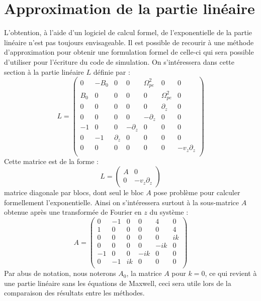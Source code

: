 
\section{Approximation de la partie linéaire}

L'obtention, à l'aide d'un logiciel de calcul formel, de l'exponentielle de la partie linéaire n'est pas toujours envisageable. Il est possible de recourir à une méthode d'approximation pour obtenir une formulation formel de celle-ci qui sera possible d'utiliser pour l'écriture du code de simulation. On s'intéressera dans cette section à la partie linéaire $L$ définie par :
$$
  L = \begin{pmatrix}
    0   & -B_0 & 0          &  0          &  \Omega_{pe}^2 & 0             & 0 \\
    B_0 &  0   & 0          &  0          &  0             & \Omega_{pe}^2 & 0 \\
    0   &  0   & 0          &  0          &  0             & \partial_z    & 0 \\
    0   &  0   & 0          &  0          & -\partial_z    & 0             & 0 \\
   -1   &  0   & 0          & -\partial_z &  0             & 0             & 0 \\
    0   & -1   & \partial_z &  0          &  0             & 0             & 0 \\
    0   &  0   & 0          &  0          &  0             & 0             & -v_z\partial_z \\
  \end{pmatrix}
$$
Cette matrice est de la forme :
$$
  L = \begin{pmatrix}
    A & 0 \\
    0 & -v_z\partial_z
  \end{pmatrix}
$$
matrice diagonale par blocs, dont seul le bloc $A$ pose problème pour calculer formellement l'exponentielle. Ainsi on s'intéressera surtout à la sous-matrice $A$ obtenue après une transformée de Fourier en $z$ du système :
$$
  A = \begin{pmatrix}
    0 & -1 & 0  &  0  &  4  & 0  \\
    1 &  0 & 0  &  0  &  0  & 4  \\
    0 &  0 & 0  &  0  &  0  & ik \\
    0 &  0 & 0  &  0  & -ik & 0  \\
   -1 &  0 & 0  & -ik &  0  & 0  \\
    0 & -1 & ik &  0  &  0  & 0  \\
  \end{pmatrix}
$$
Par abus de notation, nous noterons $A_0$, la matrice $A$ pour $k=0$, ce qui revient à une partie linéaire sans les équations de Maxwell, ceci sera utile lors de la comparaison des résultats entre les méthodes.

